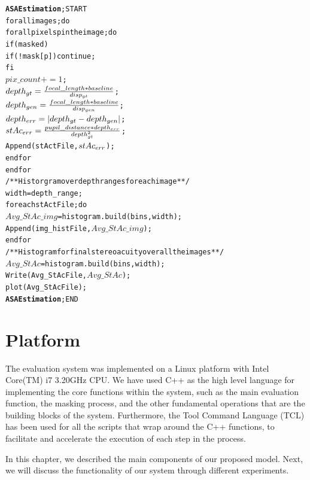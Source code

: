 \begin{alltt}
\textbf{ASA Estimation}; START
   for all images; do
      for all pixels p in the image; do
            if (masked)
               if(!mask[p]) continue;
            fi    
            \(pix\_count += 1\);
            \(depth\sb{gt} = \frac{focal\_length * baseline}{disp\sb{gt}}\);
            \(depth\sb{gen} = \frac{focal\_length * baseline}{disp\sb{gen}}\);
            \(depth\sb{err} = |depth\sb{gt}-depth\sb{gen}|\);
            \(stAc\sb{err} = \frac{pupil\_distance*depth\sb{err}}{depth\sb{gt}\sp{2}}\);
            Append(stActFile,\(stAc\sb{err}\));
      end for
   end for
   /**Historgram over depth ranges for each image**/
   width = depth\_range;
   for each stActFile; do
      \(Avg\_StAc\_img\) = histogram.build(bins,width);
      Append(img\_histFile,\(Avg\_StAc\_img\));
   end for
   /**Histogram for final stereoacuity over all the images**/
   \(Avg\_StAc\) = histogram.build(bins,width);
   Write(Avg\_StAcFile,\(Avg\_StAc\));
   plot(Avg\_StAcFile);
\textbf{ASA Estimation}; END
\end{alltt}

\section{Platform}
The evaluation system was implemented on a Linux platform with Intel Core(TM) i7 3.20GHz CPU. 
We have used C++ as the high level language for implementing 
the core functions within the system, such as the main evaluation function, 
the masking process, and the other fundamental operations that are the building blocks of the system.
Furthermore, the Tool Command Language (TCL) has been used for all the scripts that wrap around the C++ functions,
to facilitate and accelerate the execution of each step in the process. \newline

In this chapter, we described the main components of our proposed model. Next, we will discuss the functionality of our system through different experiments.

